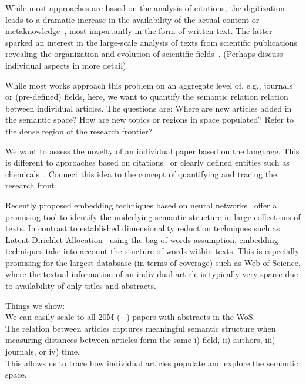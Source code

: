 \documentclass[aps,pre,twocolumn,superscriptaddress]{revtex4-1}
\begin{document}
While most approaches are based on the analysis of citations, the  digitization leads to a dramatic increase in the availability of the actual content or metaknowledge~\cite{Evans2011}, most importantly in the form of written text.
The latter sparked an interest in the large-scale analysis of texts from scientific publications revealing the organization and evolution of scientific fields~\cite{Boyack2011,Chavalarias2013,Kuhn2014,Vilhena2014,Dias2017}. (Perhaps discuss individual aspects in more detail).

While most works approach this problem on an aggregate level of, e.g., journals or (pre-defined) fields, here, we want to quantify the semantic relation relation between individual articles.
The questions are:
Where are new articles added in the semantic space? 
How are new topics or regions in space populated?
Refer to the dense region of the research frontier?

We want to assess the novelty of an individual paper based on the language.
This is different to approaches based on citations~\cite{Uzzi2013} or clearly defined entities such as chemicals~\cite{Shi2015, Foster2015}.
Connect this idea to the concept of quantifying and tracing the research front~\cite{DeSollaPrice1963}

Recently proposed embedding techniques based on neural networks~\cite{Goldberg2016} offer a promising tool to identify the underlying semantic structure in large collections of texts.
In contrast to established dimensionality reduction techniques such as Latent Dirichlet Allocation~\cite{Blei2003} using the bag-of-words assumption, embedding techniques take into account the stucture of words within texts.
This is especially promising for the largest databsase (in terms of coverage) such as Web of Science, where the textual information of an individual article is typically very sparse due to availability of only titles and abstracts.


Things we show:\\
We can easily scale to all 20M (+) papers with abstracts in the WoS.\\
The relation between articles captures meaningful semantic structure when measuring distances between articles form the same i) field, ii) authors, iii) journals, or iv) time.\\
This allows us to trace how individual articles populate and explore the semantic space.
\end{document}
